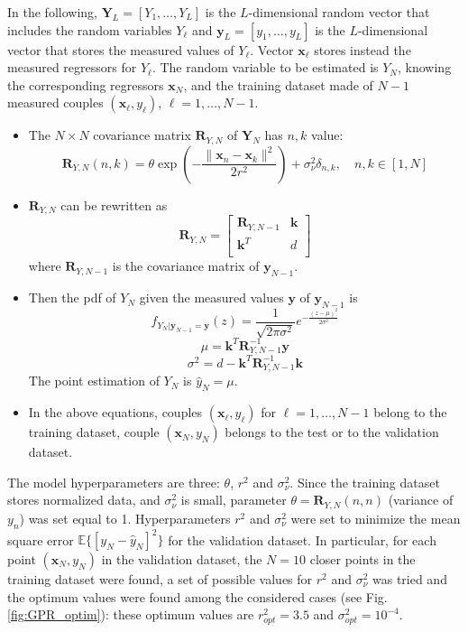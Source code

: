 \documentclass[12pt]{article}
\begin{document}
In the following, $\mathbf{Y}_L=[Y_1,\ldots,Y_L]$ is the $L$-dimensional random vector that includes the random variables $Y_\ell$ and $\mathbf{y}_{L}=[y_1,\ldots,y_{L}]$ is the $L$-dimensional vector that stores the measured values of $Y_\ell$. Vector $\mathbf{x}_\ell$ stores instead the measured regressors for $Y_\ell$. The random variable to be estimated is $Y_N$, knowing the corresponding regressors $\mathbf{x}_N$, and the training dataset made of $N-1$ measured couples $(\mathbf{x}_\ell,y_\ell)$, $\ell=1,\ldots,N-1$.
\begin{itemize}
\item The $N \times N$ covariance matrix $\mathbf{R}_{Y,N}$ of $\mathbf{Y}_N$ has $n,k$ value:
\[ \mathbf{R}_{Y,N}(n,k)=\theta \exp\left(-\frac{\|\mathbf{x}_n-\mathbf{x}_k\|^2}{2 r^2}\right)+\sigma_\nu^2\delta_{n,k},\quad n,k \in [1,N]\]
\item $\mathbf{R}_{Y,N}$ can be rewritten as
\[ \mathbf{R}_{Y,N}=
\begin{bmatrix}
\mathbf{R}_{Y,N-1} & \mathbf{k}\\
\mathbf{k}^T & d\\
\end{bmatrix}
\]
where $\mathbf{R}_{Y,N-1}$ is the covariance matrix of $\mathbf{y}_{N-1}$.
\item Then the pdf of $Y_N$ given the measured values $\mathbf{y}$ of $\mathbf{y}_{N-1}$ is
\[ f_{Y_N|\mathbf{y}_{N-1}=\mathbf{y}}(z)=\frac{1}{\sqrt{2\pi \sigma^2}}e^{-\frac{(z-\mu)^2}{2\sigma^2}}\]
\begin{equation} \mu=\mathbf{k}^T \mathbf{R}_{Y,N-1}^{-1}\mathbf{y}
\label{eq:mu}
\end{equation}
\begin{equation} \sigma^2=d-\mathbf{k}^T \mathbf{R}_{Y,N-1}^{-1}\mathbf{k}
\label{eq:sigma}
\end{equation}
The point estimation of $Y_N$ is $\hat{y}_N=\mu$.
\item In the above equations, couples $(\mathbf{x}_\ell,y_\ell)$ for $\ell=1,\ldots, N-1$ belong to the training dataset, couple $(\mathbf{x}_N,y_N)$ belongs to the test or to the validation dataset. 
\end{itemize}

The model hyperparameters are three: $\theta$, $r^2$ and $\sigma_\nu^2$. Since the training dataset stores normalized data, and $\sigma^2_\nu$ is small, parameter $\theta=\mathbf{R}_{Y,N}(n,n)$ (variance of $y_n$) was set equal to 1. 
Hyperparameters $r^2$ and $\sigma_\nu^2$ were set to minimize the mean square error $\mathbb{E}\{[y_N-\hat{y}_N]^2\}$ for the validation dataset. In particular, for each point $(\mathbf{x}_N,y_N)$ in the validation dataset, the $N=10$ closer points in the training dataset were found, a set of possible values for $r^2$ and $\sigma_\nu^2$ was tried and the optimum values were found among the considered cases (see Fig. \ref{fig:GPR_optim}): these optimum values are $r^2_{opt}=3.5$ and  $\sigma^2_{opt}=10^{-4}$.
\end{document}
